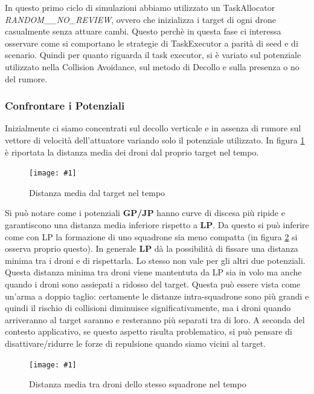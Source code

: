 \documentclass[a4paper,11pt,oneside, table]{article}
\newcommand{\putimage}[4] {
	\begin{figure}[H]
	    \centering
	    \texttt{[image: \#1]}
	    \caption{#2}\label{#3}
	\end{figure}
}
\begin{document}
In questo primo ciclo di simulazioni abbiamo utilizzato un TaskAllocator \textit{RANDOM\_\_NO\_REVIEW}, ovvero che inizializza i target di ogni drone casualmente senza attuare cambi.
Questo perch\`e in questa fase ci interessa osservare come si comportano le strategie di TaskExecutor a parit\`a di seed e di scenario.
Quindi per quanto riguarda il task executor, si \`e variato sul potenziale utilizzato nella Collision Avoidance, sul metodo di Decollo e sulla presenza o no del rumore.

\subsubsection{Confrontare i Potenziali}

Inizialmente ci siamo concentrati sul decollo verticale e in assenza di rumore sul vettore di velocit\`a dell'attuatore variando solo il potenziale utilizzato.
In figura \ref{png:task-executor-noiseless-vertical-MeanDistanceFromTarget} \`e riportata la distanza media dei droni dal proprio target nel tempo.

\putimage{images/experiments/task-executor-noiseless-vertical/MeanDistanceFromTarget.png}{Distanza media dal target nel tempo}{png:task-executor-noiseless-vertical-MeanDistanceFromTarget}{0.99}

Si pu\`o notare come i potenziali \textbf{GP/JP} hanno curve di discesa pi\`u ripide e garantiscono una distanza media inferiore rispetto a \textbf{LP}.
Da questo si pu\`o inferire come con LP la formazione di uno squadrone sia meno compatta (in figura \ref{png:task-executor-noiseless-vertical-MeanDistancesWithinSquadron} si osserva proprio questo).
In generale \textbf{LP} d\`a la possibilit\`a di fissare una distanza minima tra i droni e di rispettarla. Lo stesso non vale per gli altri due potenziali.
Questa distanza minima tra droni viene mantentuta da LP sia in volo ma anche quando i droni sono assiepati a ridosso del target.
Questa pu\`o essere vista come un'arma a doppio taglio: certamente le distanze intra-squadrone sono pi\`u grandi e quindi il rischio di collisioni diminuisce significativamente, ma i droni quando arriveranno al target saranno e resteranno pi\`u separati tra di loro. A seconda del contesto applicativo, se questo aspetto risulta problematico, si pu\`o pensare di disattivare/ridurre le forze di repulsione quando siamo vicini al target.

\putimage{images/experiments/task-executor-noiseless-vertical/MeanDistancesWithinSquadron.png}{Distanza media tra droni dello stesso squadrone nel tempo}{png:task-executor-noiseless-vertical-MeanDistancesWithinSquadron}{0.99}
\end{document}
